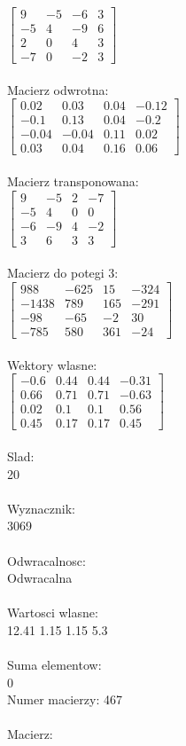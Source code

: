 \documentclass[a4paper,12pt]{article}
\begin{document}
$\begin{bmatrix} 9&-5&-6&3\\-5&4&-9&6\\2&0&4&3\\-7&0&-2&3 \end{bmatrix}$
\\
\\
Macierz odwrotna:\\

$\begin{bmatrix} 0.02&0.03&0.04&-0.12\\-0.1&0.13&0.04&-0.2\\-0.04&-0.04&0.11&0.02\\0.03&0.04&0.16&0.06 \end{bmatrix}$
\\
\\
Macierz transponowana:\\

$\begin{bmatrix} 9&-5&2&-7\\-5&4&0&0\\-6&-9&4&-2\\3&6&3&3 \end{bmatrix}$
\\
\\
Macierz do potegi 3:\\

$\begin{bmatrix} 988&-625&15&-324\\-1438&789&165&-291\\-98&-65&-2&30\\-785&580&361&-24 \end{bmatrix}$
\\
\\
Wektory wlasne:\\

$\begin{bmatrix} -0.6&0.44&0.44&-0.31\\0.66&0.71&0.71&-0.63\\0.02&0.1&0.1&0.56\\0.45&0.17&0.17&0.45 \end{bmatrix}$
\\
\\
Slad:\\
20
\\
\\
Wyznacznik:\\
3069
\\
\\
Odwracalnosc:\\
Odwracalna
\\
\\
Wartosci wlasne:\\
12.41 1.15 1.15 5.3
\\
\\
Suma elementow:\\
0
\\
\newpage
Numer macierzy:
467
\\
\\
Macierz:\\
\end{document}

